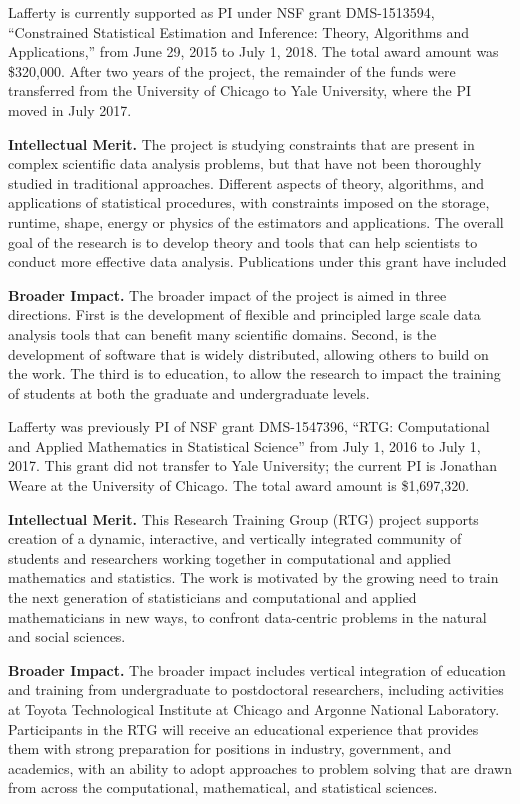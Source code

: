\vskip10pt
\noindent
Lafferty is currently supported as PI under NSF grant DMS-1513594,
``Constrained Statistical Estimation and Inference: Theory, Algorithms
and Applications,'' from June 29, 2015 to July 1, 2018. The
total award amount was \$320,000. After two years of the project, the
remainder of the funds were transferred from the University of Chicago
to Yale University, where the PI moved in July 2017.

{\bf Intellectual Merit.}  The project is studying constraints that
are present in complex scientific data analysis problems, but that
have not been thoroughly studied in traditional approaches. Different
aspects of theory, algorithms, and applications of statistical
procedures, with constraints imposed on the storage, runtime, shape,
energy or physics of the estimators and applications. The overall goal
of the research is to develop theory and tools that can help
scientists to conduct more effective data analysis. Publications 
under this grant have included 
\citep{ChatterjeeL18,MishraILH18,
abs-1803-01302,MishraLH17,YangB0L16,ChatterjeeDLZ16,ZhengL16,MishraZLH15,ZhengL15,ZhuL14,Bonak18}


{\bf Broader Impact.}  
The broader impact of the project is aimed in three directions.
First is the development of flexible and principled
large scale data analysis tools that can benefit many
scientific domains.  Second, is the development of software
that is widely distributed, allowing others to build on the work.
The third is to education, to allow the research to impact
the training of students at both the graduate and undergraduate
levels.


\vskip10pt
\noindent
Lafferty was previously PI of NSF grant DMS-1547396,
``RTG: Computational and Applied Mathematics in Statistical Science''
from July 1, 2016 to July 1, 2017. This grant did not transfer
to Yale University; the current PI is Jonathan Weare at the 
University of Chicago. The total award amount is \$1,697,320.

{\bf Intellectual Merit.}  This Research Training Group (RTG) project
supports creation of a dynamic, interactive, and vertically integrated
community of students and researchers working together in
computational and applied mathematics and statistics. The work is
motivated by the growing need to train the next generation of
statisticians and computational and applied mathematicians in new
ways, to confront data-centric problems in the natural and social
sciences.

{\bf Broader Impact.}  
The broader impact includes vertical integration 
of education and training from undergraduate to postdoctoral
researchers, including activities at 
Toyota Technological Institute at Chicago and Argonne
National Laboratory. Participants in the RTG
will receive an educational experience that provides them with strong
preparation for positions in industry, government, and academics, with
an ability to adopt approaches to problem solving that are drawn from
across the computational, mathematical, and statistical sciences.

